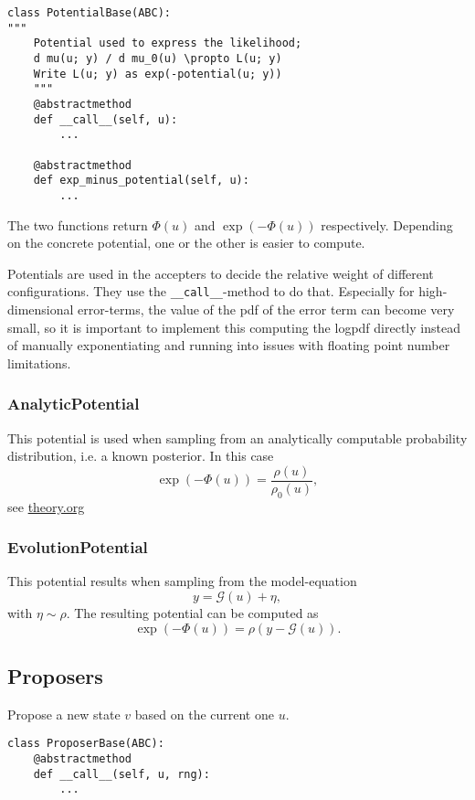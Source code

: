 \documentclass[11pt]{article}
\newcommand{\G}[1]{{\mathcal{G} \left( #1 \right)}}
\begin{document}
\begin{verbatim}
class PotentialBase(ABC):
"""
    Potential used to express the likelihood;
    d mu(u; y) / d mu_0(u) \propto L(u; y)
    Write L(u; y) as exp(-potential(u; y))
    """
    @abstractmethod
    def __call__(self, u):
        ...

    @abstractmethod
    def exp_minus_potential(self, u):
        ...
\end{verbatim}

The two functions return \(\Phi(u)\) and \(\exp(-\Phi(u))\) respectively. Depending on the
concrete potential, one or the other is easier to compute.

Potentials are used in the accepters to decide the relative weight of different configurations.
They use the \texttt{\_\_call\_\_}-method to do that. Especially for high-dimensional error-terms, the
value of the pdf of the error term can become very small, so it is important to implement this
computing the logpdf directly instead of manually exponentiating and running into issues with
floating point number limitations.

\subsubsection{AnalyticPotential}
\label{sec:orgc82a604}

This potential is used when sampling from an analytically computable probability distribution,
i.e. a known posterior. In this case
$$\exp(-\Phi(u)) = \frac{\rho(u)}{\rho_0(u)},$$
see \url{theory.org}
\subsubsection{EvolutionPotential}
\label{sec:org7633f52}

This potential results when sampling from the model-equation
$$y = \G{u} + \eta,$$
with \(\eta \sim \rho\). The resulting potential can be computed as
$$\exp(-\Phi(u)) = \rho(y - \G{u}).$$

\subsection{Proposers}
\label{sec:orgb9e5fa5}

Propose a new state \(v\) based on the current one \(u\).

\begin{verbatim}
class ProposerBase(ABC):
    @abstractmethod
    def __call__(self, u, rng):
        ...
\end{verbatim}
\end{document}
